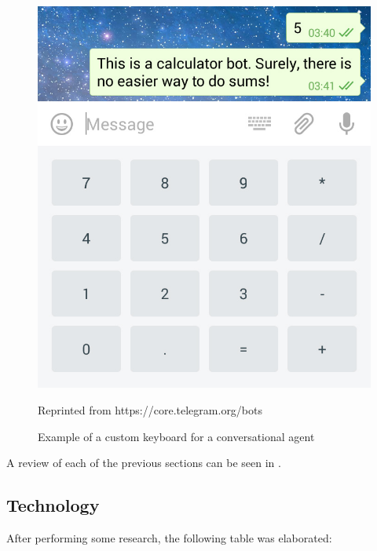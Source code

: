\documentclass[12pt,english]{article}
\begin{document}
\begin{figure}[H]
  \centering
  \includegraphics[scale=0.2]{custom_keyboard.jpg}
  \caption{Example of a custom keyboard for a conversational agent}{Reprinted from https://core.telegram.org/bots}
\end{figure}


A review of each of the previous sections can be seen in \cite{Montenegro201956}.
\newpage
\subsection{Technology}

After performing some research, the following table was elaborated:
\end{document}
